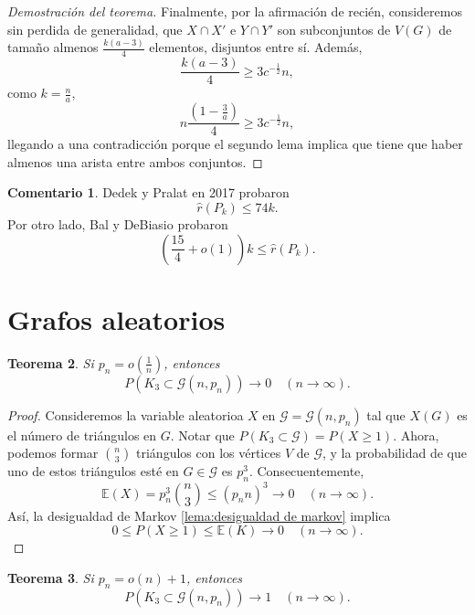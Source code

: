 \documentclass[12pt]{report}
\theoremstyle{plain}
\newtheorem{theorem}{Teorema}[section]
\theoremstyle{definition}
\newtheorem{remark}[theorem]{Comentario}
\renewcommand{\hat}[1]{\widehat{#1}}
\begin{document}
\begin{proof}[Demostración del teorema]
Finalmente, por la afirmación de recién, consideremos sin perdida de generalidad, que $X \cap X'$ e $Y \cap Y'$ son subconjuntos de $V(G)$ de tamaño almenos $\frac{k(a-3)}{4}$ elementos, disjuntos entre sí. Además,
\[
    \frac{k(a-3)}{4} \geq 3 c^{-\frac 1 2} n,
\]
como $k = \frac n a$,
\[
    n \frac{(1-\frac 3 a)}{4} \geq 3 c^{-\frac 1 2} n,
\]
llegando a una contradicción porque el segundo lema implica que tiene que haber almenos una arista entre ambos conjuntos.
\end{proof}



\begin{remark}
Dedek y Pralat en 2017 probaron
\[
    \hat r (P_k) \leq 74 k.
\]
Por otro lado, Bal y DeBiasio probaron
\[
    \left ( \frac {15} 4 + o(1) \right ) k \leq \hat r (P_k).
\]
\end{remark}


\section{Grafos aleatorios}

\begin{theorem}
Si $p_n = o(\frac 1 n)$, entonces
\[
    P(K_3 \subset \mathcal G (n,p_n)) \longrightarrow 0 \quad (n \to \infty).
\]
\end{theorem}
\begin{proof}
Consideremos la variable aleatorioa $X$ en $\mathcal G = \mathcal G(n,p_n)$ tal que $X(G)$ es el número de triángulos en $G$. Notar que $P(K_3 \subset \mathcal G) = P(X \geq 1)$. Ahora, podemos formar $\binom n 3$ triángulos con los vértices $V$ de $\mathcal G$, y la probabilidad de que uno de estos triángulos esté en $G \in \mathcal G$ es $p^3_n$. Consecuentemente,
\[
    \mathbb{E} (X) = p^3_n \binom n 3 \leq (p_nn)^3 \longrightarrow 0 \quad (n \to \infty).
\]
Así, la desigualdad de Markov \ref{lema:desigualdad de markov} implica
\[
    0 \leq P(X \geq 1) \leq \mathbb{E} (K) \longrightarrow 0 \quad (n \to \infty).
\]
\end{proof}

\begin{theorem}
Si $p_n = o (n) + 1$, entonces
\[
    P (K_3 \subset \mathcal G (n, p_n)) \longrightarrow 1 \quad (n \to \infty).
\]
\end{theorem}
\end{document}
